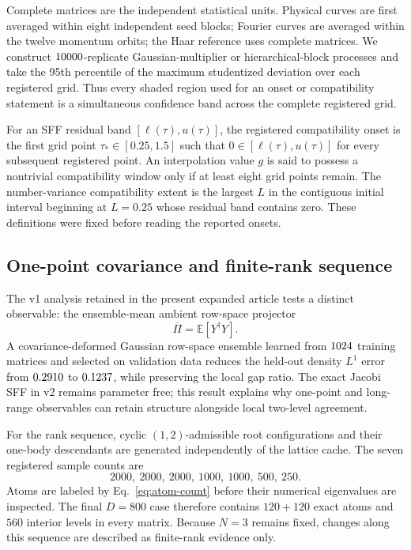 Complete matrices are the independent statistical units.  Physical curves are
first averaged within eight independent seed blocks;
Fourier curves are averaged within the twelve momentum orbits; the Haar
reference uses complete matrices.
We construct \(10000\)-replicate Gaussian-multiplier or
hierarchical-block processes and take the 95th percentile of the maximum
studentized deviation over each registered grid.
Thus every shaded region used for an onset or compatibility statement is a
simultaneous confidence band across the complete registered grid.

For an SFF residual band \([\ell(\tau),u(\tau)]\), the registered compatibility
onset is the first grid point \(\tau_*\in[0.25,1.5]\) such that
\(0\in[\ell(\tau),u(\tau)]\) for every subsequent registered point.
An interpolation value \(g\) is said to possess a nontrivial compatibility
window only if at least eight grid points remain.
The number-variance compatibility extent is the largest \(L\) in the
contiguous initial interval beginning at \(L=0.25\) whose residual band
contains zero.
These definitions were fixed before reading the reported onsets.

\subsection{One-point covariance and finite-rank sequence}

The v1 analysis retained in the present expanded article tests a distinct
observable: the ensemble-mean ambient row-space projector
\begin{equation}
 \overline\Pi=\mathbb E[Y^\dagger Y].
 \label{eq:mean-row-projector}
\end{equation}
A covariance-deformed Gaussian row-space ensemble learned from
\(1024\) training matrices and selected on validation data reduces
the held-out density \(L^1\) error from \(0.2910\) to
\(0.1237\), while preserving the local gap ratio.
The exact Jacobi SFF in v2 remains parameter free; this result explains why
one-point and long-range observables can retain structure alongside local
two-level agreement.

For the rank sequence, cyclic \((1,2)\)-admissible root configurations and
their one-body descendants are generated independently of the lattice cache.
The seven registered sample counts are
\[
 2000,\ 2000,\ 2000,\ 1000,\ 1000,\ 500,\ 250 .
\]
Atoms are labeled by Eq.~\eqref{eq:atom-count} before their numerical
eigenvalues are inspected.
The final \(D=800\) case therefore contains \(120+120\) exact atoms and
\(560\) interior levels in every matrix.
Because \(N=3\) remains fixed, changes along this sequence are described as
finite-rank evidence only.

